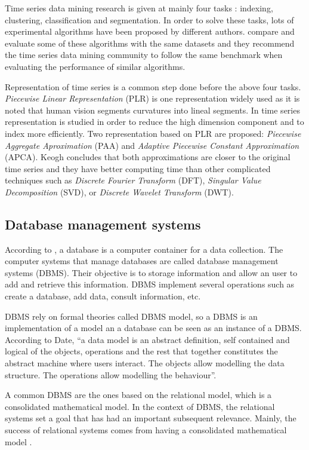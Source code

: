 Time series data mining research  is given at mainly four tasks \parencite{keogh02}: indexing, clustering, classification and segmentation. In order to solve these tasks, lots of experimental algorithms have been proposed by different authors. \textcite{keogh02} compare and evaluate some of these algorithms with the same datasets and they recommend the time series data mining community to follow the same benchmark when evaluating the performance of similar algorithms. 

Representation of time series is a common step done before the above four tasks.
\emph{Piecewise Linear Representation} (PLR) \parencite{keogh97,keogh98}  is one representation widely used as it is noted that human vision segments curvatures into lineal segments. In \textcite{keogh00,keogh01} time series representation is studied in order to reduce the high dimension component and to index more efficiently. Two representation based on PLR are proposed: \emph{Piecewise Aggregate Aproximation} (PAA) and \emph{Adaptive Piecewise Constant Approximation} (APCA). Keogh concludes that both approximations are closer to the original time series and they have better computing time than other complicated techniques such as \emph{Discrete Fourier Transform} (DFT), \emph{Singular Value Decomposition} (SVD), or \emph{Discrete Wavelet Transform} (DWT).



\subsection{Database management systems}

According to \textcite{date}, a database is a computer container for a data collection. The computer systems that manage databases are called database management systems (DBMS). Their objective is to storage information and allow an user to add and retrieve this information. DBMS implement several operations such as create a database, add data, consult information, etc.

DBMS rely on formal theories called DBMS model, so a DBMS is an implementation of a model an a database can be seen as an instance of a DBMS. According to Date, ``a data model is an abstract definition, self contained and logical of the objects, operations and the rest that together constitutes the abstract machine where users interact. The objects allow modelling the data structure. The operations allow modelling the behaviour''.

A common DBMS are the ones based on the relational model, which is a consolidated mathematical model. In the context of DBMS, the relational systems set a goal that has had an important subsequent relevance. Mainly, the success of relational systems comes from having a consolidated mathematical model \parencite{date}.


